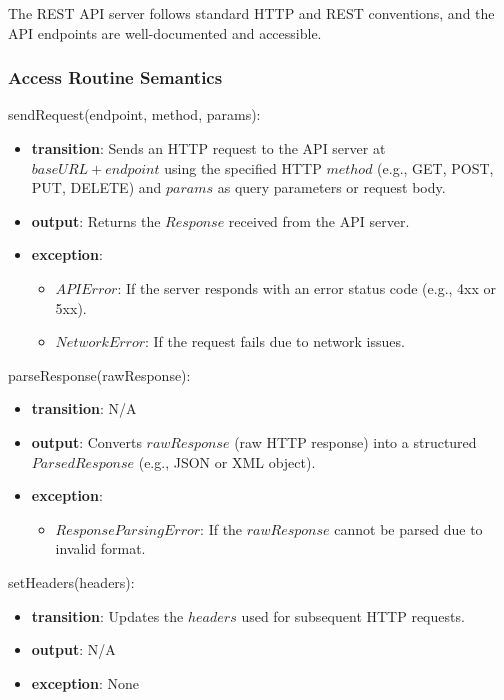 \documentclass[12pt, titlepage]{article}
\begin{document}
The REST API server follows standard HTTP and REST conventions, and the API endpoints are well-documented and accessible.

\subsubsection{Access Routine Semantics}

\noindent sendRequest(endpoint, method, params):
\begin{itemize}
  \item \textbf{transition}:
        Sends an HTTP request to the API server at \( baseURL + endpoint \) using the specified HTTP \( method \) (e.g., GET, POST, PUT, DELETE) and \( params \) as query parameters or request body.
  \item \textbf{output}:
        Returns the \( Response \) received from the API server.
  \item \textbf{exception}:
        \begin{itemize}
          \item \( APIError \): If the server responds with an error status code (e.g., 4xx or 5xx).
          \item \( NetworkError \): If the request fails due to network issues.
        \end{itemize}
\end{itemize}

\noindent parseResponse(rawResponse):
\begin{itemize}
  \item \textbf{transition}: N/A
  \item \textbf{output}:
        Converts \( rawResponse \) (raw HTTP response) into a structured \( ParsedResponse \) (e.g., JSON or XML object).
  \item \textbf{exception}:
        \begin{itemize}
          \item \( ResponseParsingError \): If the \( rawResponse \) cannot be parsed due to invalid format.
        \end{itemize}
\end{itemize}

\noindent setHeaders(headers):
\begin{itemize}
  \item \textbf{transition}:
        Updates the \( headers \) used for subsequent HTTP requests.
  \item \textbf{output}: N/A
  \item \textbf{exception}: None
\end{itemize}
\end{document}
